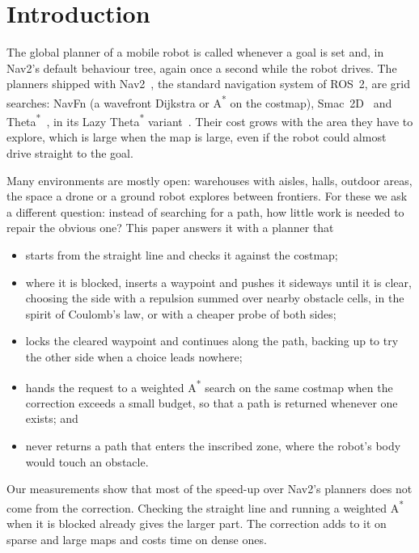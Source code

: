 \documentclass[conference]{IEEEtran}
\begin{document}
\section{Introduction}

The global planner of a mobile robot is called whenever a goal is set and, in
Nav2's default behaviour tree, again once a second while the robot drives. The
planners shipped with Nav2~\cite{macenski2020marathon}, the standard navigation
system of ROS~2, are grid searches: NavFn (a wavefront Dijkstra or
A\textsuperscript{*} on the costmap), Smac~2D~\cite{macenski2024smac} and
Theta\textsuperscript{*}~\cite{daniel2010theta}, in its Lazy Theta\textsuperscript{*}
variant~\cite{nash2010lazy}. Their cost grows with the area they
have to explore, which is large when the map is large, even if the robot could
almost drive straight to the goal.

Many environments are mostly open: warehouses with aisles, halls, outdoor areas,
the space a drone or a ground robot explores between frontiers. For these we ask
a different question: instead of searching for a path, how little work is needed
to repair the obvious one? This paper answers it with a planner that

\begin{itemize}
\item starts from the straight line and checks it against the costmap;
\item where it is blocked, inserts a waypoint and pushes it sideways until it is
  clear, choosing the side with a repulsion summed over nearby obstacle cells, in
  the spirit of Coulomb's law, or with a cheaper probe of both sides;
\item locks the cleared waypoint and continues along the path, backing up to try
  the other side when a choice leads nowhere;
\item hands the request to a weighted A\textsuperscript{*} search on the same
  costmap when the correction exceeds a small budget, so that a path is returned
  whenever one exists; and
\item never returns a path that enters the inscribed zone, where the robot's
  body would touch an obstacle.
\end{itemize}

Our measurements show that most of the speed-up over Nav2's planners does not
come from the correction. Checking the straight line and running a weighted
A\textsuperscript{*} when it is blocked already gives the larger part. The correction
adds to it on sparse and large maps and costs time on dense ones.
\end{document}
